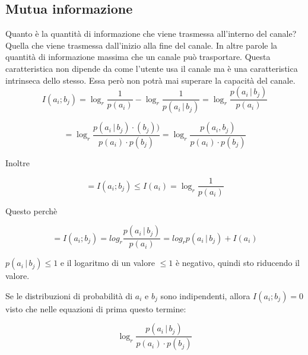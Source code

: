 \subsection*{Mutua informazione}
Quanto è la quantità di informazione che viene trasmessa all'interno del canale? Quella che viene trasmessa dall'inizio alla fine del canale. In altre parole la quantità di informazione massima che un canale può trasportare.
Questa caratteristica non dipende da come l'utente usa il canale ma è una caratteristica intrinseca dello stesso. Essa però non potrà mai superare la capacità del canale.
\begin{equation*}
I(a_i;b_j) = \log_r\frac{1}{p(a_i)} - \log_r\frac{1}{p(a_i\,|\,b_j)} = \log_r\frac{p(a_i\,|\,b_j)}{p(a_i)}
\end{equation*}

\begin{equation*}
= \log_r\frac{p(a_i\,|\,b_j)\cdotp(b_j))}{p(a_i)\cdot p(b_j)} =  \log_r\frac{p(a_i,b_j)}{p(a_i)\cdot p(b_j)} 
\end{equation*}

Inoltre 

\begin{equation*}
= I(a_i;b_j) \leq I(a_i) = \log_r\frac{1}{p(a_i)}
\end{equation*}

Questo perchè

\begin{equation*}
= I(a_i;b_j) = log_r\frac{p(a_i\,|\,b_j)}{p(a_i)} = log_rp(a_i\,|\,b_j) + I(a_i)
\end{equation*}

$p(a_i\,|\,b_j) \leq 1 $ e il logaritmo di un valore $\leq 1$ è negativo, quindi sto riducendo il valore.

Se le distribuzioni di probabilità di $a_i$ e $b_j$ sono indipendenti, allora $I(a_i;b_j) = 0$ visto che nelle equazioni di prima questo termine:

\begin{equation*}
\log_r\frac{p(a_i\,|\,b_j)}{p(a_i)\cdot p(b_j)}
\end{equation*}

